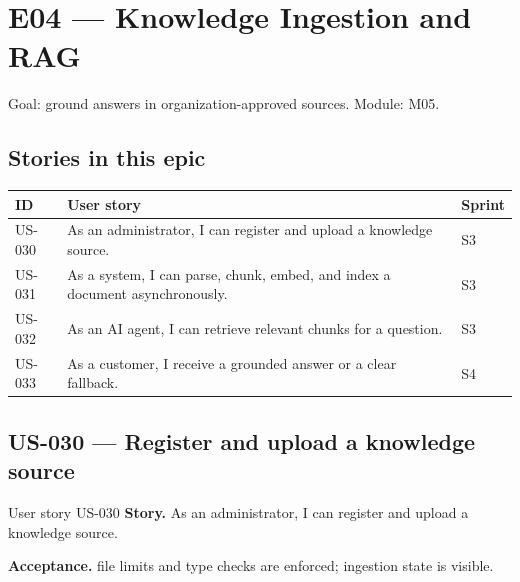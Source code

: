 \chapter{E04 --- Knowledge Ingestion and RAG}

Goal: ground answers in organization-approved sources. Module: M05.

\section*{Stories in this epic}
{\small
\begin{longtable}{@{}>{\raggedright\arraybackslash}p{}>{\raggedright\arraybackslash}p{}>{\raggedright\arraybackslash}p{}@{}}
\toprule
\textbf{ID} & \textbf{User story} & \textbf{Sprint} \\
\midrule
\endhead
\bottomrule
\endfoot
US-030 & As an administrator, I can register and upload a knowledge source. & S3 \\
US-031 & As a system, I can parse, chunk, embed, and index a document asynchronously. & S3 \\
US-032 & As an AI agent, I can retrieve relevant chunks for a question. & S3 \\
US-033 & As a customer, I receive a grounded answer or a clear fallback. & S4 \\
\end{longtable}
}



\Needspace{640pt}
\section{US-030 --- Register and upload a knowledge source}

\begin{storybox}{User story US-030}
\textbf{Story.} As an administrator, I can register and upload a knowledge source.\par
\textbf{Acceptance.} file limits and type checks are enforced; ingestion state is visible.
\end{storybox}

